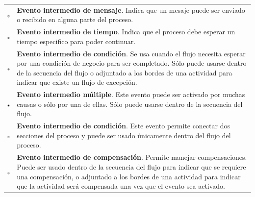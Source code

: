 \begin{itemize}
	\begin{tabular}{| m{} m{} | }%
		\rowcolor[gray]{0.97}%
		\centering\noindent\includegraphics[width=18pt]{images/procesos/bpmn/MessageEvent.png} & {\bf Evento intermedio de mensaje}. Indica que un mesaje puede ser enviado o recibido en alguna parte del proceso. \\
		\centering\noindent\includegraphics[width=18pt]{images/procesos/bpmn/TimerEventIntermediate.png} & {\bf Evento intermedio de tiempo}. Indica que el proceso debe esperar un tiempo especifico para poder continuar.\\
		\rowcolor[gray]{0.97}%
		\centering\noindent\includegraphics[width=18pt]{images/procesos/bpmn/ConditionalIntermediateEvent.png} & {\bf Evento intermedio de condición}. Se usa cuando el flujo necesita esperar por una condición de negocio para ser completado. Sólo puede usarse dentro de la secuencia del flujo o adjuntado a los bordes de una actividad para indicar que existe un flujo de excepción. \\
		\centering\noindent\includegraphics[width=18pt]{images/procesos/bpmn/MultipleIntermediateEvent.png} & {\bf Evento intermedio múltiple}. Este evento puede ser activado por muchas causas o sólo por una de ellas. Sólo puede usarse dentro de la secuencia del flujo.\\
		\rowcolor[gray]{0.97}%
		\centering\noindent\includegraphics[width=18pt]{images/procesos/bpmn/LinkIntermediateEvent.png} & {\bf Evento intermedio de condición}. Este evento permite conectar dos secciones del proceso y puede ser usado únicamente dentro del flujo del proceso.\\
		\centering\noindent\includegraphics[width=18pt]{images/procesos/bpmn/CompensationIntermediateEvent.png} & {\bf Evento intermedio de compensación}. Permite manejar compensaciones. Puede ser usado dentro de la secuencia del flujo para indicar que se requiere una compensación, o adjuntado a los bordes de una actividad para indicar que la actividad será compensada una vez que el evento sea activado.
	\end{tabular}%


\end{itemize}
